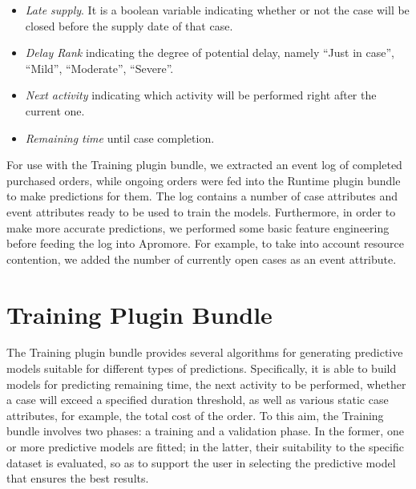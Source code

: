 \documentclass[runningheads,a4paper]{llncs}
\begin{document}
\begin{itemize}
	\item \emph{Late supply}. It is a boolean variable indicating whether or not the case will be closed before the supply date of that case.
	\item \emph{Delay Rank} indicating the degree of potential delay, namely ``Just in case'', ``Mild'', ``Moderate'', ``Severe''.
	\item \emph{Next activity} indicating which activity will be performed right after the current one.
	\item \emph{Remaining time} until case completion.
\end{itemize}

For use with the Training plugin bundle, we extracted an event log of completed purchased orders, while ongoing orders were fed into the Runtime plugin bundle to make predictions for them. The log contains a number of case attributes and event attributes ready to be used to train the models. Furthermore, in order to make more accurate predictions, we performed some basic feature engineering before feeding the log into Apromore. For example, to take into account resource contention, we added the number of currently open cases as an event attribute.

\section{Training Plugin Bundle} \label{sec:training}
The Training plugin bundle provides several algorithms for generating predictive models suitable for different types of predictions. Specifically, it is able to build models for predicting remaining time, the next activity to be performed, whether a case will exceed a specified duration threshold, as well as various static case attributes, for example, the total cost of the order.
%
To this aim, the Training bundle involves two phases: a training and a validation phase. In the former, one or more predictive models are fitted; in the latter, their suitability to the specific dataset is evaluated, so as to support the user in selecting the predictive model that ensures the best results.
\end{document}
